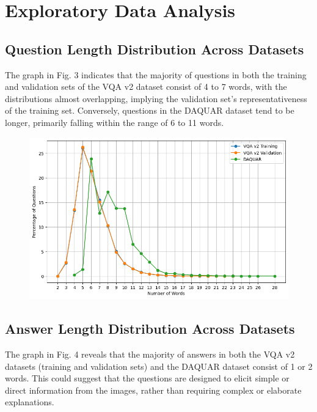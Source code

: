 \section{Exploratory Data Analysis}
\label{sec:formatting}

\subsection{Question Length Distribution Across Datasets}
The graph in Fig. 3 indicates that the majority of questions in both the training and validation sets of the VQA v2 dataset consist of 4 to 7 words, with the distributions almost overlapping, implying the validation set's representativeness of the training set. Conversely, questions in the DAQUAR dataset tend to be longer, primarily falling within the range of 6 to 11 words.

\begin{figure}[htbp]
  \centering
   \includegraphics[width=\linewidth]{sec/Images/image3.png}
   \caption{}
   \label{fig:onecol}
\end{figure}

\subsection{Answer Length Distribution Across Datasets}
The graph in Fig. 4 reveals that the majority of answers in both the VQA v2 datasets (training and validation sets) and the DAQUAR dataset consist of 1 or 2 words. This could suggest that the questions are designed to elicit simple or direct information from the images, rather than requiring complex or elaborate explanations.

